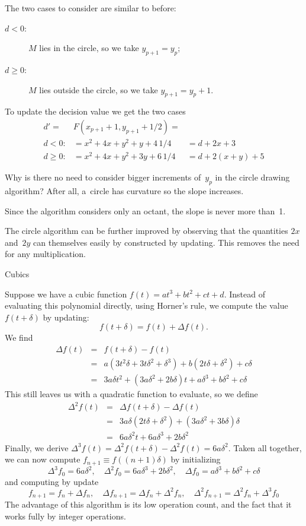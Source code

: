 The two cases to consider are similar to before:
\begin{description}
\item[$d<0$:] $M$ lies in the circle, so we take $y_{p+1}=y_p$;
\item[$d\geq0$:] $M$ lies outside the circle, so we take $y_{p+1}=y_p+1$.
\end{description}
To update the decision value we get the two cases
\[ \begin{array}{rll}
    d'=&F(x_{p+1}+1,y_{p+1}+1/2)=\\
    d<0:&= x^2+4x+y^2+y+4\,1/4&=d+2x+3\\
    d\geq0:&= x^2+4x+y^2+3y+6\,1/4&=d+2(x+y)+5
\end{array} \]
\begin{594exercise}
Why is there no need to consider bigger increments of~$y_p$ in the
circle drawing algorithm? After all, a~circle has curvature so the
slope increases.
\end{594exercise}
\begin{answer}
Since the algorithm considers only an octant, the slope is never more
than~1.
\end{answer}

The circle algorithm can be further improved by observing that the
quantities $2x$ and~$2y$ can themselves easily by constructed by
updating. This removes the need for any multiplication.

 {Cubics}

Suppose we have a cubic function $f(t)=at^3+bt^2+ct+d$. Instead
of evaluating this polynomial directly, using Horner's rule, we
compute the value $f(t+\delta)$ by updating:
\[ f(t+\delta)=f(t)+\Delta f(t). \]
We find 
\[ \begin{array}{rcl}
    \Delta f(t)&=&f(t+\delta)-f(t)\\
        &=&a(3t^2\delta+3t\delta^2+\delta^3)+b(2t\delta+\delta^2)+c\delta\\
        &=&3a\delta
    t^2+(3a\delta^2+2b\delta)t+a\delta^3+b\delta^2+c\delta
\end{array} \]
This still leaves us with a quadratic function to evaluate, so we
define 
\[ \begin{array}{rcl}
    \Delta^2f(t)&=&\Delta f(t+\delta)-\Delta f(t)\\
        &=&3a\delta(2t\delta+\delta^2)+(3a\delta^2+3b\delta)\delta\\
        &=&6a\delta^2t+6a\delta^3+2b\delta^2
\end{array} \]
Finally, we derive
$\Delta^3f(t)=\Delta^2f(t+\delta)-\Delta^2f(t)=6a\delta^2$. Taken all
together, we can now compute $f_{n+1}\equiv f((n+1)\delta)$ by
initializing
\[ \Delta^3f_0=6a\delta^2,\quad
    \Delta^2f_0=6a\delta^3+2b\delta^2,\quad
    \Delta f_0=a\delta^3+b\delta^2+c\delta
\]
and computing by update
\[  f_{n+1}=f_n+\Delta f_n,\quad
    \Delta f_{n+1}=\Delta f_n+\Delta^2f_n,\quad
    \Delta^2f_{n+1}=\Delta^2f_n+\Delta^3f_0
\]
The advantage of this algorithm is its low operation count, and the
fact that it works fully by integer operations.

